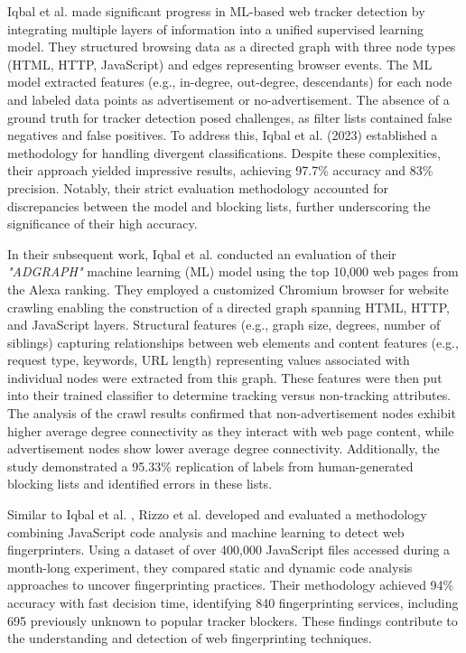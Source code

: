 Iqbal et al. \cite{iqbal2018adgraph} made significant progress in ML-based web tracker detection by integrating multiple layers of information
into a unified supervised learning model. They structured browsing data as a directed graph with three node types
(HTML, HTTP, JavaScript) and edges representing browser events. The ML model extracted features (e.g., in-degree, out-degree, descendants)
for each node and labeled data points as advertisement or no-advertisement. The absence of a ground truth for tracker detection
posed challenges, as filter lists contained false negatives and false positives. To address this, Iqbal et al. (2023) established 
a methodology for handling divergent classifications. Despite these complexities, their approach yielded impressive results,
achieving 97.7\% accuracy and 83\% precision. Notably, their strict evaluation methodology accounted for discrepancies between
the model and blocking lists, further underscoring the significance of their high accuracy.

In their subsequent work, Iqbal et al. \cite{iqbal2020adgraph} conducted an evaluation of their \emph{"ADGRAPH"} \cite{adgraph} machine learning (ML) model
using the top 10,000 web pages from the Alexa ranking. They employed a customized Chromium browser for website
crawling enabling the construction of a directed graph spanning HTML, HTTP, and
JavaScript layers. Structural features (e.g., graph size, degrees, number of siblings) capturing relationships between web
elements and content features (e.g., request type, keywords, URL length) representing values associated with individual
nodes were extracted from this graph. These features were then put into their trained classifier to determine tracking
versus non-tracking attributes. The analysis of the crawl results confirmed that non-advertisement nodes exhibit higher average
degree connectivity as they interact with web page content, while advertisement nodes show lower average degree connectivity.
Additionally, the study demonstrated a 95.33\% replication of labels from human-generated blocking lists and identified errors
in these lists.

Similar to Iqbal et al. \cite{iqbal2020adgraph}, Rizzo et al. \cite{rizzo2021unveiling} developed and
evaluated a methodology combining JavaScript code analysis and machine learning to detect web fingerprinters.
Using a dataset of over 400,000 JavaScript files accessed during a month-long experiment, they compared static
and dynamic code analysis approaches to uncover fingerprinting practices. Their methodology achieved 94\% accuracy
with fast decision time, identifying 840 fingerprinting services, including 695 previously unknown to popular tracker
blockers. These findings contribute to the understanding and detection of web fingerprinting techniques.


